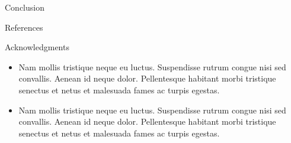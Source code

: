 {%

\begin{block}{Conclusion}
	
\end{block}
\vfill


\begin{block}{References}
	\printbibliography
\end{block}
\vfill

\begin{block}{Acknowledgments}
	
	\begin{itemize}
		\item Nam mollis tristique neque eu luctus. Suspendisse rutrum congue nisi sed convallis. Aenean id neque dolor. Pellentesque habitant morbi tristique senectus et netus et malesuada fames ac turpis egestas.
		\item Nam mollis tristique neque eu luctus. Suspendisse rutrum congue nisi sed convallis. Aenean id neque dolor. Pellentesque habitant morbi tristique senectus et netus et malesuada fames ac turpis egestas.
	\end{itemize}
	
\end{block}
}